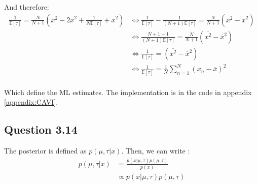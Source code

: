 \documentclass{article}
\begin{document}
And therefore:
\begin{equation}
    \begin{split}
        \frac{1}{\mathbb{E}[\tau]} = \frac{N}{N+1}\left(\overline{x^2} - 2\overline{x}^2 + \frac{1}{N\mathbb{E}[\tau]} + \overline{x}^2\right) & \Leftrightarrow \frac{1}{\mathbb{E}[\tau]} - \frac{1}{(N+1)\mathbb{E}[\tau]} = \frac{N}{N+1}\left(\overline{x^2} - \overline{x}^2\right) \\
                                                                                                                                               & \Leftrightarrow \frac{N+1-1}{(N+1)\mathbb{E}[\tau]} = \frac{N}{N+1}\left(\overline{x^2} - \overline{x}^2\right)                          \\
                                                                                                                                               & \Leftrightarrow \frac{1}{\mathbb{E}[\tau]} = \left(\overline{x^2} - \overline{x}^2\right)                                                \\
                                                                                                                                               & \Leftrightarrow \frac{1}{\mathbb{E}[\tau]} = \frac{1}{N}\sum_{n=1}^{N}(x_n - \overline{x})^2                                             \\
    \end{split}
\end{equation}

Which define the ML estimates. The implementation is in the code in appendix \ref{appendix:CAVI}.

\subsection{Question 3.14}

The posterior is defined as $p(\mu, \tau|x)$. Then, we can write :
\begin{equation}
    \begin{split}
        p(\mu, \tau|x) & = \frac{p(x|\mu, \tau)p(\mu, \tau)}{p(x)} \\
                       & \propto p(x|\mu, \tau)p(\mu, \tau)
    \end{split}
\end{equation}
\end{document}
